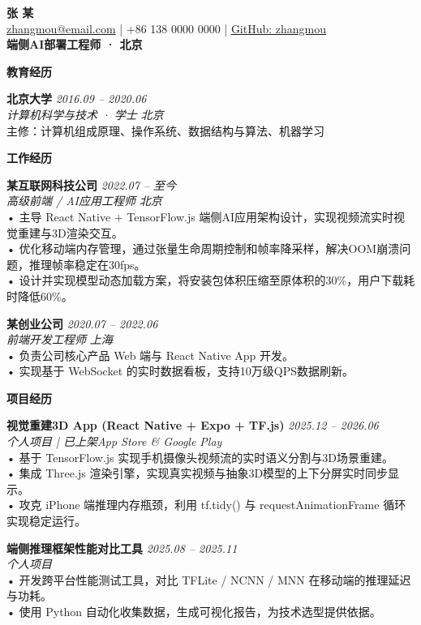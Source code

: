 \documentclass[11pt]{article}
\newcommand{\sectionheader}[1]{%
    \vspace{10pt}%
    \noindent\textcolor{sectionColor}{\textbf{\Large #1}}%
    \vspace{2pt}%
    \hrulefill
    \vspace{6pt}%
}
\newcommand{\entry}[5]{%
    \noindent\textcolor{nameColor}{\textbf{#1}} \hfill \textcolor{dateColor}{\textit{#2}} \\
    \textcolor{dateColor}{\textit{#3}} \hfill \textcolor{dateColor}{\textit{#4}} \\
    \textcolor{bodyColor}{#5}%
    \vspace{6pt}%
}
\begin{document}
\begin{center}
    {\Huge \textcolor{nameColor}{\textbf{张 某}}} \\[6pt]
    \textcolor{dateColor}{
        \href{mailto:zhangmou@email.com}{zhangmou@email.com} \quad | \quad
        +86 138 0000 0000 \quad | \quad
        \href{https://github.com/zhangmou}{GitHub: zhangmou}
    } \\[2pt]
    \textcolor{accentColor}{\textbf{端侧AI部署工程师 · 北京}}
\end{center}

\sectionheader{教育经历}
\entry{北京大学}{2016.09 -- 2020.06}
    {计算机科学与技术 · 学士}{北京}
    {主修：计算机组成原理、操作系统、数据结构与算法、机器学习}

\sectionheader{工作经历}

\entry{某互联网科技公司}{2022.07 -- 至今}
    {高级前端 / AI应用工程师}{北京}
    {• 主导 React Native + TensorFlow.js 端侧AI应用架构设计，实现视频流实时视觉重建与3D渲染交互。 \\
     • 优化移动端内存管理，通过张量生命周期控制和帧率降采样，解决OOM崩溃问题，推理帧率稳定在30fps。 \\
     • 设计并实现模型动态加载方案，将安装包体积压缩至原体积的30\%，用户下载耗时降低60\%。}

\entry{某创业公司}{2020.07 -- 2022.06}
    {前端开发工程师}{上海}
    {• 负责公司核心产品 Web 端与 React Native App 开发。 \\
     • 实现基于 WebSocket 的实时数据看板，支持10万级QPS数据刷新。}

\sectionheader{项目经历}

\entry{视觉重建3D App (React Native + Expo + TF.js)}{2025.12 -- 2026.06}
    {个人项目 \quad | \quad 已上架App Store \& Google Play}{}
    {• 基于 TensorFlow.js 实现手机摄像头视频流的实时语义分割与3D场景重建。 \\
     • 集成 Three.js 渲染引擎，实现真实视频与抽象3D模型的上下分屏实时同步显示。 \\
     • 攻克 iPhone 端推理内存瓶颈，利用 tf.tidy() 与 requestAnimationFrame 循环实现稳定运行。}

\entry{端侧推理框架性能对比工具}{2025.08 -- 2025.11}
    {个人项目}{}
    {• 开发跨平台性能测试工具，对比 TFLite / NCNN / MNN 在移动端的推理延迟与功耗。 \\
     • 使用 Python 自动化收集数据，生成可视化报告，为技术选型提供依据。}
\end{document}
